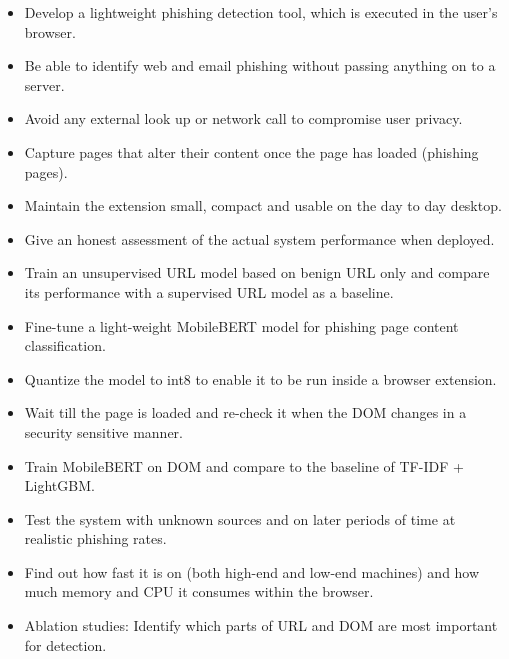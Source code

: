 \documentclass{FastFyp}
\begin{document}
\begin{itemize}
    \item Develop a lightweight phishing detection tool, which is executed in the user's browser.
    \item Be able to identify web and email phishing without passing anything on to a server.
    \item Avoid any external look up or network call to compromise user privacy.
    \item Capture pages that alter their content once the page has loaded (phishing pages).
    \item Maintain the extension small, compact and usable on the day to day desktop.
    \item Give an honest assessment of the actual system performance when deployed.
    \item Train an unsupervised URL model based on benign URL only and compare its performance with a supervised URL model as a baseline.
    \item Fine-tune a light-weight MobileBERT model for phishing page content classification.
    \item Quantize the model to int8 to enable it to be run inside a browser extension.
    \item Wait till the page is loaded and re-check it when the DOM changes in a security sensitive manner.
    \item Train MobileBERT on DOM and compare to the baseline of TF-IDF + LightGBM.
    \item Test the system with unknown sources and on later periods of time at realistic phishing rates.
    \item Find out how fast it is on (both high-end and low-end machines) and how much memory and CPU it consumes within the browser.
    \item Ablation studies: Identify which parts of URL and DOM are most important for detection.
\end{itemize}
\end{document}
